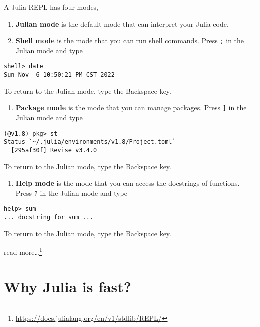 \documentclass[
  notoc %
]{tufte-book}
\DeclareRobustCommand{\href}[2]{#2\footnote{\url{#1}}}
\providecommand{\tightlist}{%
  \setlength{\itemsep}{0pt}\setlength{\parskip}{0pt}
}
\newcommand{\passthrough}[1]{#1}
\begin{document}
A Julia REPL has four modes,

\begin{enumerate}
\def\labelenumi{\arabic{enumi}.}
\item
  \textbf{Julian mode} is the default mode that can interpret your Julia
  code.
\item
  \textbf{Shell mode} is the mode that you can run shell commands. Press
  \passthrough{\lstinline!;!} in the Julian mode and type
\end{enumerate}

\begin{lstlisting}
shell> date
Sun Nov  6 10:50:21 PM CST 2022
\end{lstlisting}

To return to the Julian mode, type the Backspace key.

\begin{enumerate}
\def\labelenumi{\arabic{enumi}.}
\setcounter{enumi}{2}
\tightlist
\item
  \textbf{Package mode} is the mode that you can manage packages. Press
  \passthrough{\lstinline!]!} in the Julian mode and type
\end{enumerate}

\begin{lstlisting}
(@v1.8) pkg> st
Status `~/.julia/environments/v1.8/Project.toml`
  [295af30f] Revise v3.4.0
\end{lstlisting}

To return to the Julian mode, type the Backspace key.

\begin{enumerate}
\def\labelenumi{\arabic{enumi}.}
\setcounter{enumi}{3}
\tightlist
\item
  \textbf{Help mode} is the mode that you can access the docstrings of
  functions. Press \passthrough{\lstinline!?!} in the Julian mode and
  type
\end{enumerate}

\begin{lstlisting}
help> sum
... docstring for sum ...
\end{lstlisting}

To return to the Julian mode, type the Backspace key.

\href{https://docs.julialang.org/en/v1/stdlib/REPL/}{read more\ldots{}}

\hypertarget{sec:whyjulia}{%
\section{Why Julia is fast?}\label{sec:whyjulia}}
\end{document}
